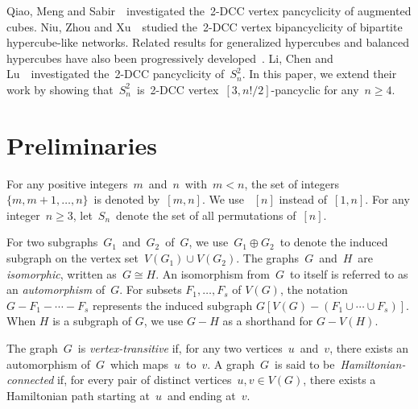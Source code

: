 \documentclass[12pt,a4paper]{amsart}
\theoremstyle{definition}
\begin{document}
	Qiao, Meng and Sabir~\cite{QMS22}~investigated the~2-DCC vertex pancyclicity of augmented cubes.
	Niu, Zhou and Xu~\cite{NXL21}~studied the~2-DCC vertex bipancyclicity of bipartite hypercube-like networks.
	Related results for generalized hypercubes and balanced hypercubes have also been progressively developed~\cite{WHC20}. Li, Chen and Lu~\cite{Li25}~investigated the~2-DCC pancyclicity of~$S_n^2$. In this paper, we extend their work by showing that~$S_n^2$~is~2-DCC vertex~$[3,n!/2]$-pancyclic for any~$n\ge4$.
	
	
	\section{Preliminaries}
For any positive integers~$m$~and~$n$~with~$m<n$, the set of integers~$\{m,m+1,\ldots,n\}$~is denoted by~$[m,n]$. We use ~$[n]$ instead of~$[1,n]$. For any integer~$n\ge 3$, let~$S_n$~denote the set of all permutations of~$[n]$.



For two subgraphs~$G_1$~and~$G_2$~of~$G$, we use~$G_1\oplus G_2$~to denote the induced subgraph on the vertex set~$V(G_1)\cup V(G_2)$. The graphs~$G$~and~$H$~are {\em isomorphic}, written as~$G\cong H$. An isomorphism from~$G$~to itself is referred to as an {\em automorphism} of~$G$. For subsets $F_1,\ldots,F_s$ of $V(G)$, the notation $G-F_1-\cdots-F_s$ represents the induced subgraph $G[V(G)-(F_1\cup\cdots\cup F_s)]$. When $H$ is a subgraph of $G$, we use $G-H$ as a shorthand for $G-V(H)$.


The graph~$G$~is {\em vertex-transitive} if, for any two vertices~$u$~and~$v$, there exists an automorphism of~$G$~which maps~$u$~to~$v$. A graph~$G$~is said to be~{\em Hamiltonian-connected} if, for every pair of distinct vertices~$u,v\in V(G)$, there exists a Hamiltonian path starting at~$u$~and ending at~$v$.
\end{document}
